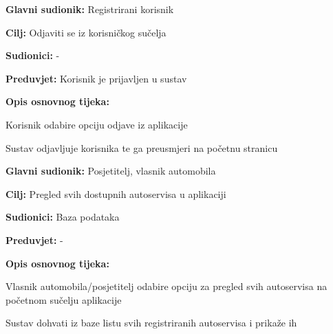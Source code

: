 \noindent {}
\begin{packed_item}

	\item \textbf{Glavni sudionik: } Registrirani korisnik
	\item  \textbf{Cilj:} Odjaviti se iz korisničkog sučelja
	\item  \textbf{Sudionici:} -
	\item  \textbf{Preduvjet:} Korisnik je prijavljen u sustav
	\item  \textbf{Opis osnovnog tijeka:}

	\item[] \begin{packed_enum}

		\item Korisnik odabire opciju odjave iz aplikacije
		\item Sustav odjavljuje korisnika te ga preusmjeri na početnu stranicu
	\end{packed_enum}

\end{packed_item}

\noindent {}
\begin{packed_item}

	\item \textbf{Glavni sudionik: } Posjetitelj, vlasnik automobila
	\item  \textbf{Cilj:} Pregled svih dostupnih autoservisa u aplikaciji
	\item  \textbf{Sudionici:} Baza podataka
	\item  \textbf{Preduvjet:} -
	\item  \textbf{Opis osnovnog tijeka:}

	\item[] \begin{packed_enum}

		\item Vlasnik automobila/posjetitelj odabire opciju za pregled svih autoservisa na početnom sučelju aplikacije
		\item Sustav dohvati iz baze listu svih registriranih autoservisa i prikaže ih
	\end{packed_enum}

\end{packed_item}

